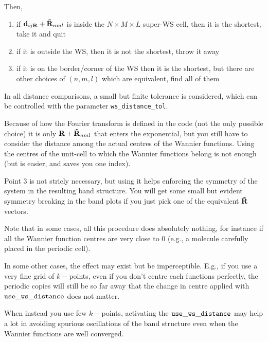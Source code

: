 Then,
\begin{enumerate}
\item if $\bm{\mathrm{d}}_{ij\bm{\mathrm{R}}}+ \bm{\mathrm{\tilde R}}_{nml}$ is inside the
  $N\times M \times L$ super-WS cell, then it is the shortest, take it and quit

\item if it is outside the WS, then it is not the shortest, throw it away

\item if it is on the border/corner of the WS then it is the shortest, but there
are other choices of $(n,m,l)$ which are equivalent, find all of them
\end{enumerate}

In all distance comparisons, a small but finite tolerance is considered,
which can be controlled with the parameter {\tt ws\_distance\_tol}.

Because of how the Fourier transform is defined in the \wannier{} code (not the only
possible choice) it is only $\bm{\mathrm{R}}+\bm{\mathrm{\tilde R}}_{nml}$
that enters the exponential, but you still have to consider the distance
among the actual centres of the Wannier functions. Using
the centres of the unit-cell to which the Wannier functions belong
is not enough (but is easier, and saves you one index).

Point 3 is not stricly necessary, but using it helps enforcing the
symmetry of the system in the resulting band structure. You
will get some small but evident symmetry breaking in the band
plots if you just pick one of the equivalent $\bm{\mathrm{\tilde R}}$ vectors.

Note that in some cases, all this procedure does absolutely nothing,
for instance if all the Wannier function centres are very close to 0
(e.g., a molecule carefully placed in the periodic cell).

In some other cases, the effect may exist but be imperceptible. E.g.,
if you use a very fine grid of $k-$points, even if you don't centre
each functions perfectly, the periodic copies will still be so far away
that the change in centre applied with $\tt use\_ws\_distance$ does not matter.

When instead you use few $k-$points, activating the $\tt use\_ws\_distance$
may help a lot in avoiding spurious oscillations of the band structure
even when the Wannier functions are well converged.
